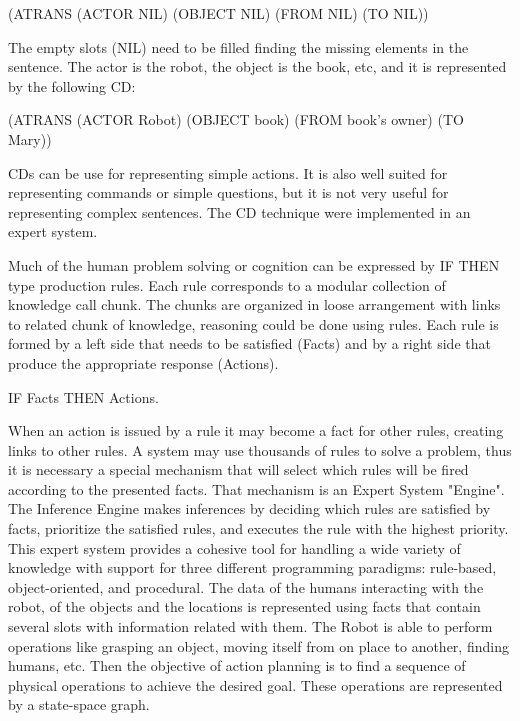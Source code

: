 \documentclass{llncs}
\begin{document}
	(ATRANS (ACTOR NIL) (OBJECT NIL) (FROM NIL) (TO NIL))
\vspace{.01 in}

The empty slots (NIL) need to be filled finding the missing elements in the sentence. The actor is the robot, the 
object is the book, etc, and it is represented by the following CD:
\vspace{.01 in}

	(ATRANS (ACTOR Robot) (OBJECT book) (FROM book's owner) (TO Mary))
\vspace{.01 in}


CDs can be use for representing simple actions. It is also well suited for representing commands or simple questions, but it is not very useful for representing complex sentences.
The CD technique were implemented in an expert system.


Much of the human problem solving or cognition can be expressed by IF THEN type production rules. Each rule corresponds to a modular collection of knowledge call chunk. The chunks are organized in loose arrangement with links to related chunk of knowledge, reasoning could be done using rules. 
Each rule is formed by a left side that needs to be satisfied (Facts) and by a right side that produce the appropriate response (Actions).  
\vspace{.01 in}

		IF  Facts  THEN  Actions.
\vspace{.01 in}

When an action is issued by a rule it may become a fact for other rules, creating links to other rules. A system may use thousands of rules to solve a problem, thus it is necessary a special mechanism that will select which rules will be fired according to the presented facts. That mechanism is an Expert System "Engine".
The Inference Engine makes inferences by deciding which rules are satisfied by facts, prioritize the 
satisfied rules, and executes the rule with the highest priority.
This expert system provides a cohesive tool for handling a wide variety of knowledge with support for three different programming paradigms: rule-based, object-oriented, and procedural.
The data of the humans interacting with the robot, of the objects and the locations is represented using facts that contain several slots with information related with them.
The Robot is able to perform operations like grasping an object, moving itself from on place to another, finding humans, etc. Then the objective of action planning is to find a sequence of physical operations to achieve the desired goal.
These operations are represented by a state-space graph.
\end{document}
